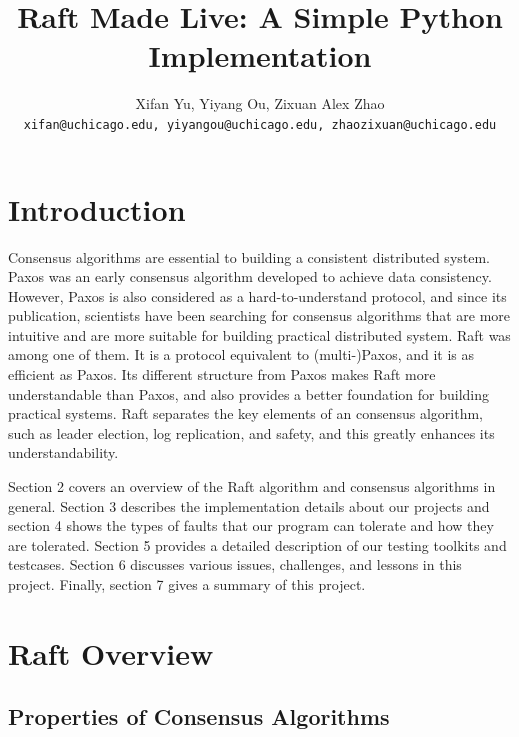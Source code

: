 \documentclass[11pt]{article}
\begin{document}
\author{%
  Xifan Yu, \hspace{0.9in} Yiyang Ou, \hspace{0.9in} Zixuan Alex Zhao\\
 \texttt{xifan@uchicago.edu, yiyangou@uchicago.edu, zhaozixuan@uchicago.edu}}
\title{Raft Made Live: A Simple Python Implementation }
\maketitle


\section{Introduction}

Consensus algorithms are essential to building a consistent distributed system. Paxos \cite{Paxos} was an early consensus algorithm developed to achieve data consistency. However, Paxos is also considered as a hard-to-understand protocol, and since its publication, scientists have been searching for consensus algorithms that are more intuitive and are more suitable for building practical distributed system. Raft \cite{Raft} was among one of them. It is a protocol equivalent to (multi-)Paxos, and it is as efficient as Paxos. Its different structure from Paxos makes Raft more understandable than Paxos, and also provides a better foundation for building practical systems. Raft separates the key elements of an consensus algorithm, such as leader election, log replication, and safety, and this greatly enhances its understandability.

Section 2 covers an overview of the Raft algorithm and consensus algorithms in general. Section 3 describes the implementation details about our projects and section 4 shows the types of faults that our program can tolerate and how they are tolerated. Section 5 provides a detailed description of our testing toolkits and testcases. Section 6 discusses various issues, challenges, and lessons in this project. Finally, section 7 gives a summary of this project.

\section{Raft Overview}

\subsection{Properties of Consensus Algorithms}
\end{document}
